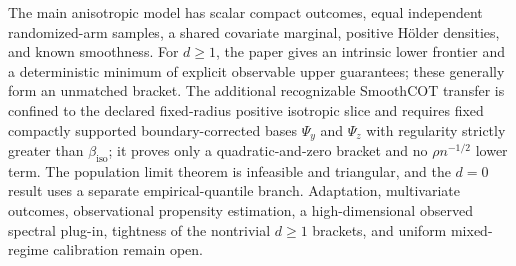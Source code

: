 The main anisotropic model has scalar compact outcomes, equal independent randomized-arm samples, a shared covariate marginal, positive H\"older densities, and known smoothness. For \(d\ge1\), the paper gives an intrinsic lower frontier and a deterministic minimum of explicit observable upper guarantees; these generally form an unmatched bracket. The additional recognizable SmoothCOT transfer is confined to the declared fixed-radius positive isotropic slice and requires fixed compactly supported boundary-corrected bases \(\Psi_y\) and \(\Psi_z\) with regularity strictly greater than \(\beta_{\mathrm{iso}}\); it proves only a quadratic-and-zero bracket and no \(\rho n^{-1/2}\) lower term. The population limit theorem is infeasible and triangular, and the \(d=0\) result uses a separate empirical-quantile branch. Adaptation, multivariate outcomes, observational propensity estimation, a high-dimensional observed spectral plug-in, tightness of the nontrivial \(d\ge1\) brackets, and uniform mixed-regime calibration remain open.
